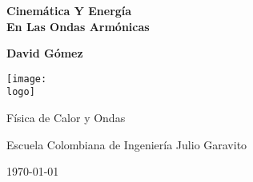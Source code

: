 \documentclass{article}
\newcommand{\logo}{"logo-eci.png"}
\newcommand{\titlename}{Cinemática Y Energía\\[10pt] En Las Ondas Armónicas}%
\renewcommand{\author}{{David Gómez}}
\begin{document}
\begin{titlepage}
    \begin{center}
        \vspace{1cm}

        \textbf{\Huge{\titlename}}

        \vspace{1.5cm}

        \textbf{\large{\author}}

        \vspace{3cm}

        \texttt{[image: \\logo]}
        
        \vfill

        Física de Calor y Ondas

        Escuela Colombiana de Ingeniería Julio Garavito

        \today
    \end{center}
\end{titlepage}

\clearpage
\tableofcontents
















\end{document}
